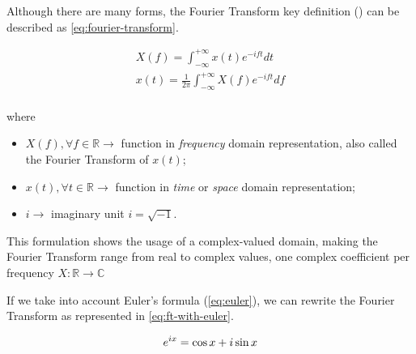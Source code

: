 \documentclass[
  oneside,
  11pt, a4paper,
  footinclude=true,
  headinclude=true,
  cleardoublepage=empty
]{scrbook}
\newcommand{\eqname}[1]{\tag*{#1}}%
\begin{document}
Although there are many forms, the Fourier Transform key definition (\cite{adams2020signals}) can be described as \autoref{eq:fourier-transform}.

\begin{equation} \label{eq:fourier-transform}
    \begin{split}
        X(f) = \int_{-\infty}^{+\infty} x(t)e^{-i f t} dt \\
        x(t) = \frac{1}{2\pi} \int_{-\infty}^{+\infty} X(f)e^{-i f t} df \\
    \end{split} %
\end{equation}

where 

\begin{itemize}
    \item \( X(f), \forall f \in \mathbb{R} \rightarrow \) function in \textit{frequency} domain representation, also called the Fourier Transform of \( x(t) \);
    \item \( x(t), \forall t \in \mathbb{R} \rightarrow \) function in \textit{time} or \textit{space} domain representation;
    \item \( i \rightarrow \) imaginary unit \( i = \sqrt{-1} \).
\end{itemize}

This formulation shows the usage of a complex-valued domain, making the Fourier Transform range from real to complex values, one complex coefficient per frequency \( X : \mathbb{R} \rightarrow \mathbb{C} \) 

If we take into account Euler's formula (\autoref{eq:euler}), we can rewrite the Fourier Transform as represented in \autoref{eq:ft-with-euler}.

\begin{equation} \label{eq:euler}
    e^{ix} = \cos x + i \sin x \\ %
\end{equation}
\end{document}
